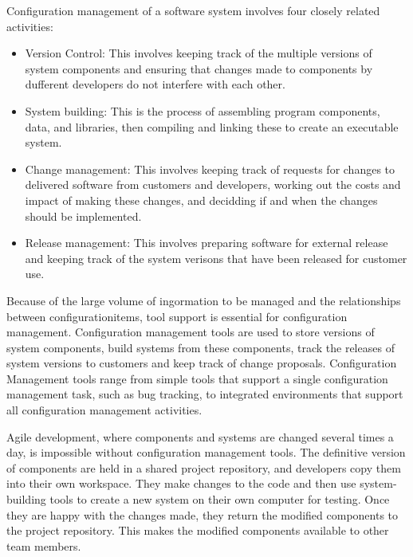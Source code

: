 Configuration management of a software system involves four closely related activities:
\begin{itemize}
    \item Version Control: This involves keeping track of the multiple versions of system components and ensuring that changes made to components by dufferent developers do not interfere with each other.
    \item System building: This is the process of assembling program components, data, and libraries, then compiling and linking these to create an executable system.
    \item Change management: This involves keeping track of requests for changes to delivered software from customers and developers, working out the costs and impact of making these changes, and decidding if and when the changes should be implemented.
    \item Release management: This involves preparing software for external release and keeping track of the system verisons that have been released for customer use. 
\end{itemize}

Because of the large volume of ingormation to be managed and the relationships between configurationitems, tool support is essential for configuration management. Configuration management tools are used to store versions of system components, build systems from these components, track the releases of system versions to customers and keep track of change proposals. Configuration Management tools range from simple tools that support a single configuration management task, such as bug tracking, to integrated environments that support all configuration management activities.

Agile development, where components and systems are changed several times a day, is impossible without configuration management tools. The definitive version of components are held in a shared project repository, and developers copy them into their own workspace. They make changes to the code and then use system-building tools to create a new system on their own computer for testing. Once they are happy with the changes made, they return the modified components to the project repository. This makes the modified components available to other team members.

